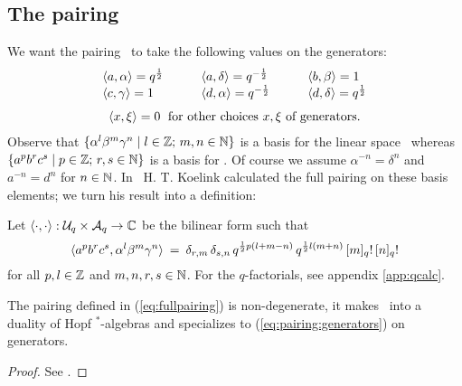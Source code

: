 \subsection{The pairing}
We want the pairing \UqAq\ to take the following values on the generators:
\begin{equation}\label{eq:pairing:generators}
  \begin{array}{c}
   \begin{array}{lclcl}
     \pair{a}{\alpha} = q^\frac{1}{2} & \hspace{1em} & \pair{a}{\delta}= q^{-\frac{1}{2}} &
                           \hspace{1em}  & \pair{b}{\beta} = 1 \\
     \pair{c}{\gamma} = 1  &  & \pair{d}{\alpha} =q^{-\frac{1}{2}}&
                                   & \pair{d}{\delta} = q^\frac{1}{2}
   \end{array} \\
   \pair{x}{\xi} =0 \vertXL\; \mbox{ for other choices $x, \xi$ of generators.}
 \end{array}
\end{equation}
Observe that
$\{\alpha^l \beta^m \gamma^n \mid l \in \mathbb{Z};\, m,n \in \mathbb{N} \}$ is
a basis for the linear space \Aq\ whereas
$\{ a^p b^r c^s \mid p \in \mathbb{Z};\, r,s \in \mathbb{N} \}$
is a basis for \Uq\@. Of course we assume $\alpha^{-n} = \delta^n$
and $a^{-n} = d^n$ for $n \in \mathbb{N}$. In \cite{Koelink:thesis,Koelink:QE2}\
H. T. Koelink calculated the full pairing on these basis elements;
we turn his result into a definition:


\begin{defn}
Let $\langle\cdot, \cdot\rangle : {\mathcal U}_q \times {\mathcal A}_q \rightarrow \mathbb{C}$ be the bilinear form such that
\begin{equation} \label{eq:fullpairing}
 \langle a^p b^r c^s,\alpha^l \beta^m \gamma^n \rangle
      \:=\: \delta_{r,m}\,  \delta_{s,n} \, q^{\frac{1}{2}p(l+m-n)} \,
                         q^{\frac{1}{2}l(m+n)} \,[m]_q!\, [n]_q!
\end{equation}
for all $p,l \in \mathbb{Z}$ and $m,n,r,s \in \mathbb{N}$.
For the $q$-factorials, see appendix \ref{app:qcalc}\@.
\end{defn}


\begin{prop} \label{prop:dual_pair}
The pairing defined in (\ref{eq:fullpairing}) is non-degenerate,
it makes \UqAq\ into a duality of Hopf $^*$-algebras and
specializes to (\ref{eq:pairing:generators}) on generators.
\end{prop}
\begin{proof}
See \cite{Koelink:thesis,Koelink:QE2,Fons:DPHA}\@.
\end{proof}


